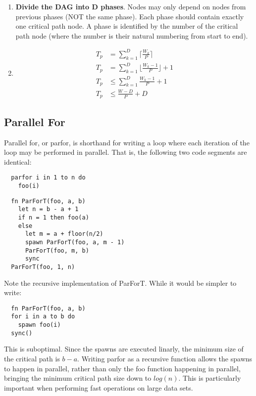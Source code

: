 \documentclass{standalone}
\begin{document}
\begin{enumerate}
  \item \textbf{Divide the DAG into D phases}. Nodes may only depend on nodes
    from previous phases (NOT the same phase). Each phase should contain exactly
    one critical path node. A phase is identified by the number of the critical
    path node (where the number is their natural numbering from start to end).
  \item \begin{align*}
    T_p &= \sum_{k=1}^D \lceil\frac{W_k}{P}\rceil\\
    T_p &= \sum_{k=1}^D \lfloor\frac{W_k - 1}{P}\rfloor + 1\\
    T_p &\leq \sum_{k=1}^D \frac{W_k - 1}{P} + 1\\
    T_p &\leq \frac{W - D}{P} + D
  \end{align*}
\end{enumerate}

\subsection{Parallel For}
Parallel for, or parfor, is shorthand for writing a loop where each iteration of
the loop may be performed in parallel. That is, the following two code segments
are identical:

\begin{lstlisting}
  parfor i in 1 to n do
    foo(i)
\end{lstlisting}

\begin{lstlisting}
  fn ParForT(foo, a, b)
    let n = b - a + 1
    if n = 1 then foo(a)
    else
      let m = a + floor(n/2)
      spawn ParForT(foo, a, m - 1)
      ParForT(foo, m, b)
      sync
  ParForT(foo, 1, n)
\end{lstlisting}

Note the recursive implementation of ParForT.
While it would be simpler to write:

\begin{lstlisting}
  fn ParForT(foo, a, b)
  for i in a to b do
    spawn foo(i)
  sync()
\end{lstlisting}

This is suboptimal. Since the spawns are executed linarly, the minimum size of
the critical path is $b - a$. Writing parfor as a recursive function allows the
spawns to happen in parallel, rather than only the foo function happening in
parallel, bringing the minimum critical path size down to $log(n)$. This is
particularly important when performing fast operations on large data sets.
\end{document}
